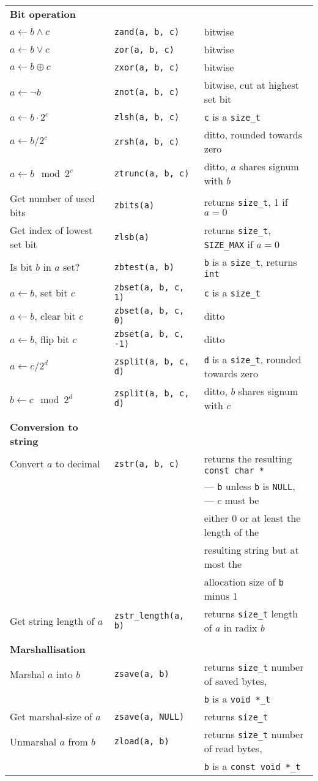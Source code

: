 \documentclass[10pt]{article}
\newcommand{\size}{{\tt size\_t}}
\newcommand{\ullong}{{\tt unsigned long long int}}
\newcommand{\entry}[3]{ #2 & {\tt #1} & #3 \\ }
\newcommand{\cont}[1]{ & & #1 \\ }
\begin{document}
\begin{tabular}{lll}



\textbf{Bit operation} \\
\entry{zand(a, b, c)}      {$a \gets b \wedge c$}         {bitwise}
\entry{zor(a, b, c)}       {$a \gets b \vee c$}           {bitwise}
\entry{zxor(a, b, c)}      {$a \gets b \oplus c$}         {bitwise}
\entry{znot(a, b, c)}      {$a \gets \lnot b$}            {bitwise, cut at highest set bit}
\entry{zlsh(a, b, c)}      {$a \gets b \cdot 2^c$}        {{\tt c} is a \size{}}
\entry{zrsh(a, b, c)}      {$a \gets b / 2^c$}            {ditto, rounded towards zero}
\entry{ztrunc(a, b, c)}    {$a \gets b \mod 2^c$}         {ditto, $a$ shares signum with $b$}
\entry{zbits(a)}           {Get number of used bits}      {returns \size{}, 1 if $a = 0$}
\entry{zlsb(a)}            {Get index of lowest set bit}  {returns \size{}, {\tt SIZE\_MAX} if $a = 0$}
\entry{zbtest(a, b)}       {Is bit $b$ in $a$ set?}       {{\tt b} is a \size{}, returns {\tt int}}
\entry{zbset(a, b, c, 1)}  {$a \gets b$, set bit $c$}     {{\tt c} is a \size{}}
\entry{zbset(a, b, c, 0)}  {$a \gets b$, clear bit $c$}   {ditto}
\entry{zbset(a, b, c, -1)} {$a \gets b$, flip bit $c$}    {ditto}
\entry{zsplit(a, b, c, d)} {$a \gets c / 2^d$}            {{\tt d} is a \size{}, rounded towards zero}
\entry{zsplit(a, b, c, d)} {$b \gets c \mod 2^d$}         {ditto, $b$ shares signum with $c$}
\\

\textbf{Conversion to string} \\
\entry{zstr(a, b, c)}           {Convert $a$ to decimal}   {returns the resulting {\tt const char *}}
\cont                                                      {--- {\tt b} unless {\tt b} is
                                                                {\tt NULL}, --- $c$ must be}
\cont                                                      {either 0 or at least the length of the}
\cont                                                      {resulting string but at most the}
\cont                                                      {allocation size of {\tt b} minus 1}
\entry{zstr\_length(a, b)}      {Get string length of $a$} {returns \size{} length of $a$ in radix $b$}
\\

\textbf{Marshallisation} \\
\entry{zsave(a, b)}    {Marshal $a$ into $b$}    {returns \size{} number of saved bytes,}
\cont                                            {{\tt b} is a {\tt void *\_t}}
\entry{zsave(a, NULL)} {Get marshal-size of $a$} {returns \size{}}
\entry{zload(a, b)}    {Unmarshal $a$ from $b$}  {returns \size{} number of read bytes,}
\cont                                            {{\tt b} is a {\tt const void *\_t}}


\end{tabular}
\end{document}
